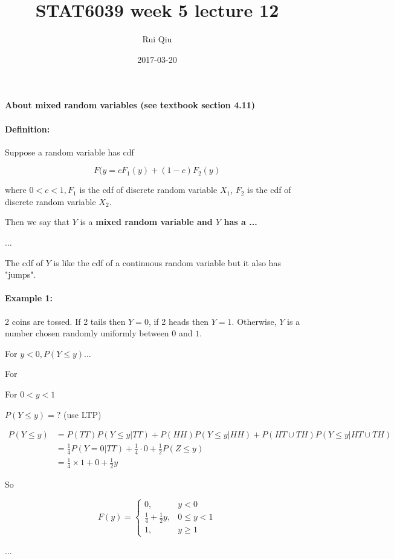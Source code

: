 \documentclass[a4paper, 11pt, twoside]{article}
\begin{document}
\title{STAT6039 week 5 lecture 12}
\author{Rui Qiu}
\date{2017-03-20}

\maketitle

\textbf{About mixed random variables (see textbook section 4.11)}


\paragraph{Definition:} Suppose a random variable has cdf

\[F(y=cF_1(y)+(1-c)F_2(y)\]

where $0<c<1, F_1$ is the cdf of discrete random variable $X_1$, $F_2$ is the cdf of discrete random variable $X_2$.

Then we say that $Y$ is  a \textbf{mixed random variable and $Y$ has a ...}

...

The cdf of $Y$ is like the cdf of a continuous random variable but it also has "jumps".

\paragraph{Example 1:} 2 coins are tossed. If 2 tails then $Y=0$, if 2 heads then $Y=1$. Otherwise, $Y$ is a number chosen randomly uniformly between $0$ and $1$.

For $y < 0, P(Y\leq y)...$

For 

For $0<y<1$

$P(Y\leq y)=?$ (use LTP)

\[
\begin{split}
	P(Y\leq y) &= P(TT)P(Y\leq y|TT) + P(HH)P(Y\leq y|HH) + P(HT\cup TH)P(Y\leq y|HT\cup TH)\\
	&=\frac{1}{4}P(Y=0|TT)+\frac{1}{4}\cdot 0 +\frac{1}{2}P(Z\leq y)\\
	&=\frac{1}{4}\times 1 + 0 + \frac{1}{2}y
\end{split}
\]

So 

\[F(y) = \begin{cases}
 0, &y < 0\\
 \frac{1}{4} + \frac{1}{2}y, &0\leq y < 1\\
 1, &y\geq 1
 \end{cases}
\]

...
\end{document}
